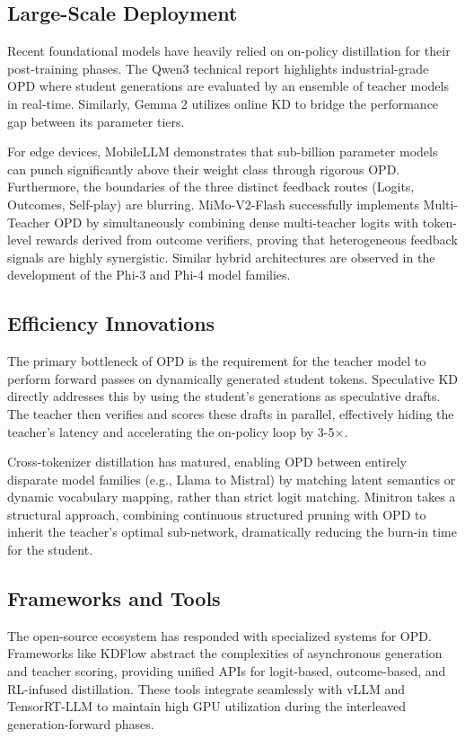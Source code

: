 \subsection{Large-Scale Deployment}
Recent foundational models have heavily relied on on-policy distillation for their post-training phases. The Qwen3 technical report \citep{arxiv_2505_09388} highlights industrial-grade OPD where student generations are evaluated by an ensemble of teacher models in real-time. Similarly, Gemma 2 \citep{arxiv_2406_06608} utilizes online KD to bridge the performance gap between its parameter tiers. 

For edge devices, MobileLLM \citep{arxiv_2509_24945} demonstrates that sub-billion parameter models can punch significantly above their weight class through rigorous OPD. Furthermore, the boundaries of the three distinct feedback routes (Logits, Outcomes, Self-play) are blurring. MiMo-V2-Flash \citep{arxiv_2601_02780} successfully implements Multi-Teacher OPD by simultaneously combining dense multi-teacher logits with token-level rewards derived from outcome verifiers, proving that heterogeneous feedback signals are highly synergistic. Similar hybrid architectures are observed in the development of the Phi-3 \citep{arxiv_2404_14219} and Phi-4 \citep{arxiv_2503_01743} model families.

\subsection{Efficiency Innovations}
The primary bottleneck of OPD is the requirement for the teacher model to perform forward passes on dynamically generated student tokens. Speculative KD \citep{arxiv_2410_11325, arxiv_2510_24021} directly addresses this by using the student's generations as speculative drafts. The teacher then verifies and scores these drafts in parallel, effectively hiding the teacher's latency and accelerating the on-policy loop by 3-5$\times$.

Cross-tokenizer distillation \citep{arxiv_2402_12030, arxiv_2310_13332} has matured, enabling OPD between entirely disparate model families (e.g., Llama to Mistral) by matching latent semantics or dynamic vocabulary mapping, rather than strict logit matching. Minitron \citep{arxiv_2311_09829} takes a structural approach, combining continuous structured pruning with OPD to inherit the teacher's optimal sub-network, dramatically reducing the burn-in time for the student.

\subsection{Frameworks and Tools}
The open-source ecosystem has responded with specialized systems for OPD. Frameworks like KDFlow \citep{arxiv_2603_01875} abstract the complexities of asynchronous generation and teacher scoring, providing unified APIs for logit-based, outcome-based, and RL-infused distillation. These tools integrate seamlessly with vLLM and TensorRT-LLM to maintain high GPU utilization during the interleaved generation-forward phases.

